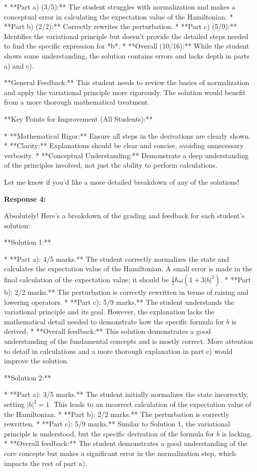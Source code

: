 \documentclass[a4paper,11pt]{article}
\begin{document}
*   **Part a) (3/5):** The student struggles with normalization and makes a conceptual error in calculating the expectation value of the Hamiltonian.
*   **Part b) (2/2):** Correctly rewrites the perturbation.
*   **Part c) (5/9):** Identifies the variational principle but doesn't provide the detailed steps needed to find the specific expression for *b*.
*   **Overall (10/16):** While the student shows some understanding, the solution contains errors and lacks depth in parts a) and c).

**General Feedback:** This student needs to review the basics of normalization and apply the variational principle more rigorously. The solution would benefit from a more thorough mathematical treatment.

**Key Points for Improvement (All Students):**

*   **Mathematical Rigor:** Ensure all steps in the derivations are clearly shown.
*   **Clarity:** Explanations should be clear and concise, avoiding unnecessary verbosity.
*   **Conceptual Understanding:** Demonstrate a deep understanding of the principles involved, not just the ability to perform calculations.

Let me know if you'd like a more detailed breakdown of any of the solutions! 

\bigskip    
\textbf{Response 4:}

Absolutely! Here's a breakdown of the grading and feedback for each student's solution:

**Solution 1:**

* **Part a): 4/5 marks.** The student correctly normalizes the state and calculates the expectation value of the Hamiltonian. A small error is made in the final calculation of the expectation value; it should be  \(\frac{1}{2} \hbar\omega (1+3|b|^2)\). 
* **Part b): 2/2 marks.** The perturbation is correctly rewritten in terms of raising and lowering operators.
* **Part c): 5/9 marks.** The student understands the variational principle and its goal. However, the explanation lacks the mathematical detail needed to demonstrate how the specific formula for \(b\) is derived. 
* **Overall feedback:** This solution demonstrates a good understanding of the fundamental concepts and is mostly correct. More attention to detail in calculations and a more thorough explanation in part c) would improve the solution.

**Solution 2:**

* **Part a): 3/5 marks.** The student initially normalizes the state incorrectly, setting \(|b|^2 = 1\). This leads to an incorrect calculation of the expectation value of the Hamiltonian.
* **Part b): 2/2 marks.** The perturbation is correctly rewritten.
* **Part c): 5/9 marks.**  Similar to Solution 1, the variational principle is understood, but the specific derivation of the formula for \(b\) is lacking.
* **Overall feedback:** The student demonstrates a good understanding of the core concepts but makes a significant error in the normalization step, which impacts the rest of part a). 
\end{document}
